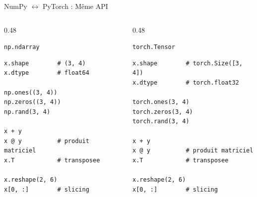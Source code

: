 \documentclass[aspectratio=169, 10pt]{beamer}
\begin{document}
\begin{frame}[fragile]{NumPy $\leftrightarrow$ PyTorch : Même API}
  \begin{columns}[T]
    \begin{column}{0.48\textwidth}
      \begin{block}{\texttt{np.ndarray}}
        \begin{lstlisting}[style=pythonstyle]
x.shape        # (3, 4)
x.dtype        # float64

np.ones((3, 4))
np.zeros((3, 4))
np.rand(3, 4)

x + y
x @ y          # produit matriciel
x.T            # transposee

x.reshape(2, 6)
x[0, :]        # slicing
        \end{lstlisting}
      \end{block}
    \end{column}
    \begin{column}{0.48\textwidth}
      \begin{exampleblock}{\texttt{torch.Tensor}}
        \begin{lstlisting}[style=pythonstyle]
x.shape        # torch.Size([3, 4])
x.dtype        # torch.float32

torch.ones(3, 4)
torch.zeros(3, 4)
torch.rand(3, 4)

x + y
x @ y          # produit matriciel
x.T            # transposee

x.reshape(2, 6)
x[0, :]        # slicing
        \end{lstlisting}
      \end{exampleblock}
    \end{column}
  \end{columns}
\end{frame}
\end{document}
